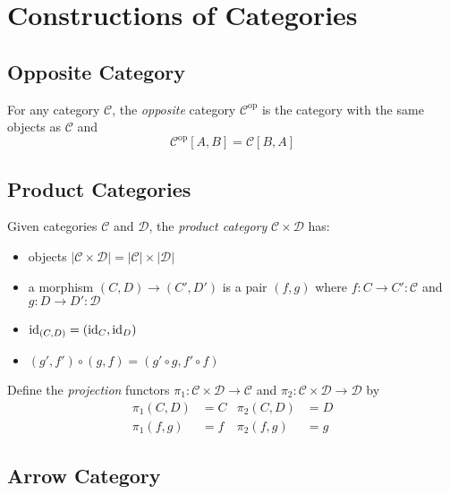 \chapter{Constructions of Categories}

\section{Opposite Category}

\begin{df}
    For any category $\mathcal{C}$, the \emph{opposite} category $\mathcal{C}^\mathrm{op}$ is the category with the same objects as $\mathcal{C}$ and
    \[ \mathcal{C}^\mathrm{op}[A,B] = \mathcal{C}[B,A] \]
\end{df}

\section{Product Categories}

\begin{df}
Given categories $\mathcal{C}$ and $\mathcal{D}$, the \emph{product category} $\mathcal{C} \times \mathcal{D}$ has:
\begin{itemize}
\item objects $|\mathcal{C} \times \mathcal{D}| = |\mathcal{C}| \times |\mathcal{D}|$
\item a morphism $(C,D) \rightarrow (C',D')$ is a pair $(f,g)$ where $f : C \rightarrow C' : \mathcal{C}$ and $g : D \rightarrow D' : \mathcal{D}$
\item $\mathrm{id}_{(C,D)} = (\mathrm{id}_{C},\mathrm{id}_{D})$
\item $(g',f') \circ (g,f) = (g' \circ g, f' \circ f)$
\end{itemize}

Define the \emph{projection} functors $\pi_1 : \mathcal{C} \times \mathcal{D} \rightarrow \mathcal{C}$ and $\pi_2 : \mathcal{C} \times \mathcal{D} \rightarrow \mathcal{D}$ by
\begin{align*}
\pi_1(C,D) & = C & \pi_2(C,D) & = D \\
\pi_1(f,g) & = f & \pi_2(f,g) & = g
\end{align*}
\end{df}

\section{Arrow Category}

